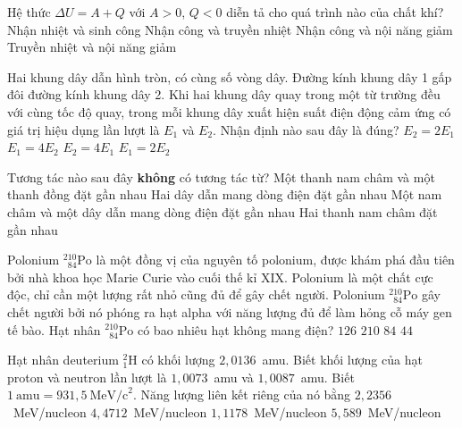 	\begin{ex}%
		Hệ thức $\Delta U=A+Q$ với $A>0$, $Q<0$ diễn tả cho quá trình nào của chất khí?
		\choice
		{Nhận nhiệt và sinh công}
		{\True Nhận công và truyền nhiệt}
		{Nhận công và nội năng giảm}
		{Truyền nhiệt và nội năng giảm}
	\end{ex}

	\begin{ex}%
		Hai khung dây dẫn hình tròn, có cùng số vòng dây. Đường kính khung dây 1 gấp đôi đường kính khung dây 2. Khi hai khung dây quay trong một từ trường đều với cùng tốc độ quay, trong mỗi khung dây xuất hiện suất điện động cảm ứng có giá trị hiệu dụng lần lượt là $E_1$ và $E_2$. Nhận định nào sau đây là đúng?
		\choice
		{$E_2=2E_1$}
		{\True $E_1=4E_2$}
		{$E_2=4E_1$}
		{$E_1=2E_2$}
	\end{ex}

	\begin{ex}%
		Tương tác nào sau đây \textbf{không} có tương tác từ?
		\choice
		{\True Một thanh nam châm và một thanh đồng đặt gần nhau}
		{Hai dây dẫn mang dòng điện đặt gần nhau}
		{Một nam châm và một dây dẫn mang dòng điện đặt gần nhau}
		{Hai thanh nam châm đặt gần nhau}
	\end{ex}

	\begin{ex}%
		Polonium $^{210}_{\phantom{1}84}\text{Po}$ là một đồng vị của nguyên tố polonium, được khám phá đầu tiên bởi nhà khoa học Marie Curie vào cuối thế kỉ XIX. Polonium là một chất cực độc, chỉ cần một lượng rất nhỏ cũng đủ để gây chết người. Polonium $^{210}_{\phantom{1}84}\text{Po}$ gây chết người bởi nó phóng ra hạt alpha với năng lượng đủ để làm hỏng cỗ máy gen tế bào. Hạt nhân $^{210}_{\phantom{1}84}\text{Po}$ có bao nhiêu hạt không mang điện?
		\choice
		{\True $126$}
		{$210$}
		{$84$}
		{$44$}
	\end{ex}

	\begin{ex}%
		Hạt nhân deuterium ${}^2_1\text{H}$ có khối lượng $2{,}0136$~amu. Biết khối lượng của hạt proton và neutron lần lượt là $1{,}0073$~amu và $1{,}0087$~amu. Biết $1~\text{amu}=931{,}5~\text{MeV/c}^2$. Năng lượng liên kết riêng của nó bằng
		\choice
		{$2{,}2356$~MeV/nucleon}
		{$4{,}4712$~MeV/nucleon}
		{\True $1{,}1178$~MeV/nucleon}
		{$5{,}589$~MeV/nucleon}
	\end{ex}

